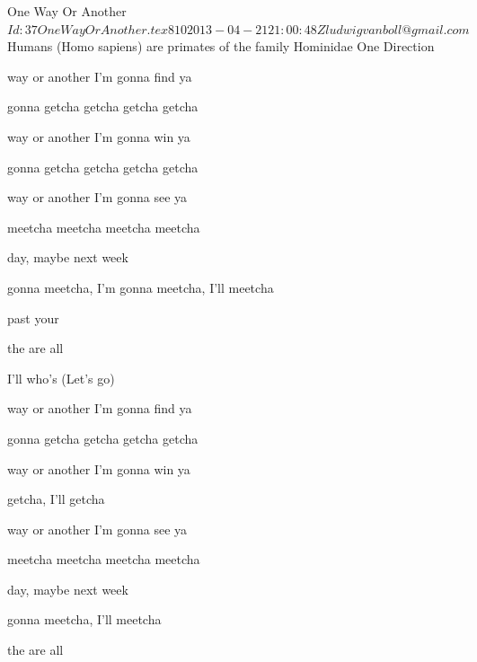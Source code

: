 \begin{SBSong}{One Way Or Another}
    {$Id: 37OneWayOrAnother.tex 810 2013-04-21 21:00:48Z ludwigvanboll@gmail.com $}
    {Humans (Homo sapiens) are primates of the family Hominidae}
    {One Direction}
  \begin{SBChorus}
     way or another I'm gonna find ya

     gonna getcha getcha getcha getcha

     way or another I'm gonna win ya

     gonna getcha getcha getcha getcha

     way or another I'm gonna see ya

     meetcha meetcha meetcha meetcha

     day, maybe next week

     gonna meetcha, I'm gonna meetcha, I'll meetcha
  \end{SBChorus}
  \begin{SBVerse}
      past your 

     the  are all 

   I'll  who's   (Let's go)
  \end{SBVerse}
  \begin{SBChorus}
     way or another I'm gonna find ya

     gonna getcha getcha getcha getcha

     way or another I'm gonna win ya

     getcha, I'll getcha

     way or another I'm gonna see ya

     meetcha meetcha meetcha meetcha

     day, maybe next week

     gonna meetcha, I'll meetcha
  \end{SBChorus}
  \CBPageBrk
  \begin{SBVerse}
      the  are all 


\end{SBVerse}
\end{SBSong}
